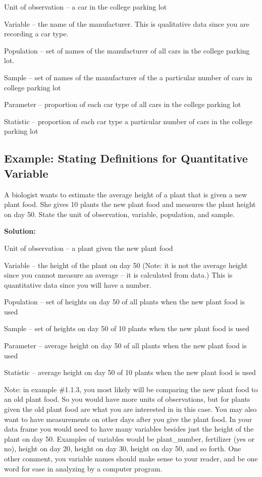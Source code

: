 \documentclass[
]{book}
\begin{document}
Unit of observation -- a car in the college parking lot

Variable -- the name of the manufacturer. This is qualitative data since you are recording a car type.

Population -- set of names of the manufacturer of all cars in the college parking lot.

Sample -- set of names of the manufacturer of the a particular number of cars in college parking lot

Parameter -- proportion of each car type of all cars in the college parking lot

Statistic -- proportion of each car type a particular number of cars in the college parking lot

\hypertarget{example-stating-definitions-for-quantitative-variable}{%
\subsection{Example: Stating Definitions for Quantitative Variable}\label{example-stating-definitions-for-quantitative-variable}}

A biologist wants to estimate the average height of a plant that is given a new plant food. She gives 10 plants the new plant food and measures the plant height on day 50. State the unit of observation, variable, population, and sample.

\textbf{Solution:}

Unit of observation -- a plant given the new plant food

Variable -- the height of the plant on day 50 (Note: it is not the average height since you cannot measure an average -- it is calculated from data.) This is quantitative data since you will have a number.

Population -- set of heights on day 50 of all plants when the new plant food is used

Sample -- set of heights on day 50 of 10 plants when the new plant food is used

Parameter -- average height on day 50 of all plants when the new plant food is used

Statistic -- average height on day 50 of 10 plants when the new plant food is used

Note: in example \#1.1.3, you most likely will be comparing the new plant food to an old plant food. So you would have more units of observations, but for plants given the old plant food are what you are interested in in this case. You may also want to have measurements on other days after you give the plant food. In your data frame you would need to have many variables besides just the height of the plant on day 50. Examples of variables would be plant\_number, fertilizer (yes or no), height on day 20, height on day 30, height on day 50, and so forth. One other comment, you variable names should make sense to your reader, and be one word for ease in analyzing by a computer program.
\end{document}
